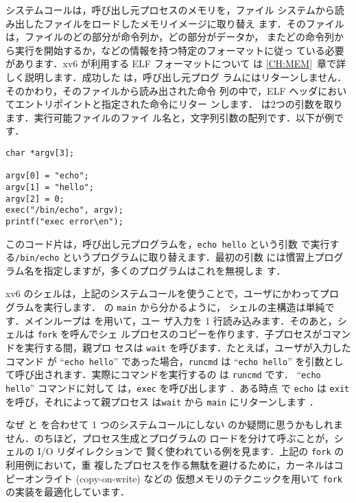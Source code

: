  システムコールは，呼び出し元プロセスのメモリを，ファイル
システムから読み出したファイルをロードしたメモリイメージに取り替え
ます．そのファイルは，ファイルのどの部分が命令列か，どの部分がデータか，
またどの命令列から実行を開始するか，などの情報を持つ特定のフォーマットに従っ
ている必要があります．xv6 が利用する ELF フォーマットについて
は \ref{CH:MEM}~章で詳しく説明します．成功した  は，呼び出し元プログ
ラムにはリターンしません．そのかわり，そのファイルから読み出された命令
列の中で，ELF ヘッダにおいてエントリポイントと指定された命令にリター
ンします． は2つの引数を取ります．実行可能ファイルのファイ
ル名と，文字列引数の配列です．以下が例です．
\begin{lstlisting}[]
char *argv[3];

argv[0] = "echo";
argv[1] = "hello";
argv[2] = 0;
exec("/bin/echo", argv);
printf("exec error\en");
\end{lstlisting}
このコード片は，呼び出し元プログラムを，\lstinline{echo hello} という引数
で実行する\lstinline{/bin/echo} というプログラムに取り替えます．最初の引数
には慣習上プログラム名を指定しますが，多くのプログラムはこれを無視しま
す．

xv6 のシェルは，上記のシステムコールを使うことで，ユーザにかわってプロ
グラムを実行します． の \lstinline{main} から分かるように，
シェルの主構造は単純です．メインループは  を用いて，ユー
ザ入力を 1 行読み込みます．そのあと，シェルは \lstinline{fork} を呼んでシェ
ルプロセスのコピーを作ります．子プロセスがコマンドを実行する間，親プロ
セスは \lstinline{wait} を呼びます．たとえば，ユーザが入力したコマンド
が 
``\lstinline{echo hello}''
であった場合，\lstinline{runcmd} は 
``\lstinline{echo hello}''
を引数として呼び出されます．実際にコマンドを実行するの
は \lstinline{runcmd}  です．
``\lstinline{echo hello}''
コマンドに対して
は，\lstinline{exec} を呼び出します ．ある時点
で \lstinline{echo} は \lstinline{exit} を呼び，それによって親プロセス
は\lstinline{wait} から \lstinline{main} にリターンします ．


なぜ  と  を合わせて 1 つのシステムコールにしない
のか疑問に思うかもしれません．のちほど，プロセス生成とプログラムの
ロードを分けて呼ぶことが，シェルの I/O リダイレクションで
賢く使われている例を見ます．上記の \lstinline{fork} の利用例において，重
複したプロセスを作る無駄を避けるために，カーネルはコピーオンライト (copy-on-write) などの
仮想メモリのテクニックを用いて \lstinline{fork} の実装を最適化しています．

